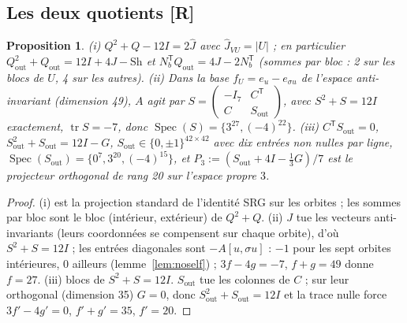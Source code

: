 \documentclass[11pt,a4paper]{article}
\newtheorem{proposition}[theorem]{Proposition}
\theoremstyle{definition}
\theoremstyle{remark}
\newcommand{\tr}{\operatorname{tr}}
\newcommand{\Spec}{\operatorname{Spec}}
\newcommand{\Sh}{\mathrm{Sh}}
\newcommand{\Sout}{S_{\mathrm{out}}}
\newcommand{\Qout}{Q_{\mathrm{out}}}
\newcommand{\st}[1]{\textbf{[#1]}}
\begin{document}
\subsection{Les deux quotients \st{R}}
\begin{proposition}\label{prop:quot}
(i) $Q^2+Q-12I=2\hat J$ avec $\hat J_{VU}=|U|$ ; en particulier $\Qout^2+\Qout=12I+4J-\Sh$ et $N_b^{\mathsf T}\Qout=4J-2N_b^{\mathsf T}$ (sommes par bloc : 2 sur les blocs de $U$, 4 sur les autres).
(ii) Dans la base $f_U=e_u-e_{\sigma u}$ de l'espace anti-invariant (dimension 49), $A$ agit par $S=\begin{pmatrix}-I_7&C^{\mathsf T}\\ C&\Sout\end{pmatrix}$,
avec $S^2+S=12I$ exactement, $\tr S=-7$, donc $\Spec(S)=\{3^{27},(-4)^{22}\}$.
(iii) $C^{\mathsf T}\Sout=0$, $\Sout^2+\Sout=12I-G$, $\Sout\in\{0,\pm1\}^{42\times42}$ avec dix entrées non nulles par ligne, $\Spec(\Sout)=\{0^7,3^{20},(-4)^{15}\}$,
et $P_3:=(\Sout+4I-\tfrac13G)/7$ est le projecteur orthogonal de rang 20 sur l'espace propre $3$.
\end{proposition}
\begin{proof}
(i) est la projection standard de l'identité SRG sur les orbites ; les sommes par bloc sont le bloc (intérieur, extérieur) de $Q^2+Q$.
(ii) $J$ tue les vecteurs anti-invariants (leurs coordonnées se compensent sur chaque orbite), d'où $S^2+S=12I$ ; les entrées diagonales sont $-A[u,\sigma u]$ : $-1$ pour les sept orbites intérieures, $0$ ailleurs (lemme~\ref{lem:noself}) ; $3f-4g=-7$, $f+g=49$ donne $f=27$.
(iii) blocs de $S^2+S=12I$. $\Sout$ tue les colonnes de $C$ ; sur leur orthogonal (dimension 35) $G=0$, donc $\Sout^2+\Sout=12I$ et la trace nulle force $3f'-4g'=0$, $f'+g'=35$, $f'=20$.
\end{proof}
\end{document}

